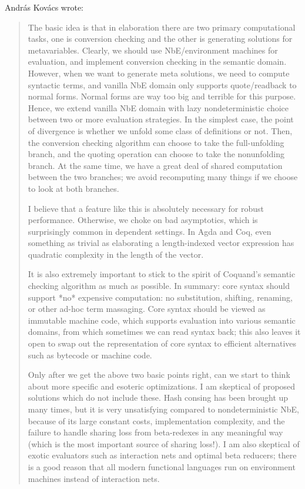 \begin{subappendices}
\begin{minorcomment}

András Kovács wrote:
\begin{quotation}
The basic idea is that in elaboration there are two primary computational tasks, one is conversion checking and the other is generating solutions for metavariables. Clearly, we should use NbE/environment machines for evaluation, and implement conversion checking in the semantic domain. However, when we want to generate meta solutions, we need to compute syntactic terms, and vanilla NbE domain only supports quote/readback to normal forms. Normal forms are way too big and terrible for this purpose. Hence, we extend vanilla NbE domain with lazy nondeterministic choice between two or more evaluation strategies. In the simplest case, the point of divergence is whether we unfold some class of definitions or not. Then, the conversion checking algorithm can choose to take the full-unfolding branch, and the quoting operation can choose to take the nonunfolding branch. At the same time, we have a great deal of shared computation between the two branches; we avoid recomputing many things if we choose to look at both branches.

I believe that a feature like this is absolutely necessary for robust performance. Otherwise, we choke on bad asymptotics, which is surprisingly common in dependent settings. In Agda and Coq, even something as trivial as elaborating a length-indexed vector expression has quadratic complexity in the length of the vector.

It is also extremely important to stick to the spirit of Coquand's semantic checking algorithm as much as possible. In summary: core syntax should support *no* expensive computation: no substitution, shifting, renaming, or other ad-hoc term massaging. Core syntax should be viewed as immutable machine code, which supports evaluation into various semantic domains, from which sometimes we can read syntax back; this also leaves it open to swap out the representation of core syntax to efficient alternatives such as bytecode or machine code.

Only after we get  the above two basic points right, can we start to think about more specific and esoteric optimizations. I am skeptical of proposed solutions which do not include these. Hash consing has been brought up many times, but it is very unsatisfying compared to nondeterministic NbE, because of its large constant costs, implementation complexity, and the failure to handle sharing loss from beta-redexes in any meaningful way (which is the most important source of sharing loss!). I am also skeptical of exotic evaluators such as interaction nets and optimal beta reducers; there is a good reason that all modern functional languages run on environment machines instead of interaction nets.


\end{quotation}
\end{minorcomment}
\end{subappendices}
